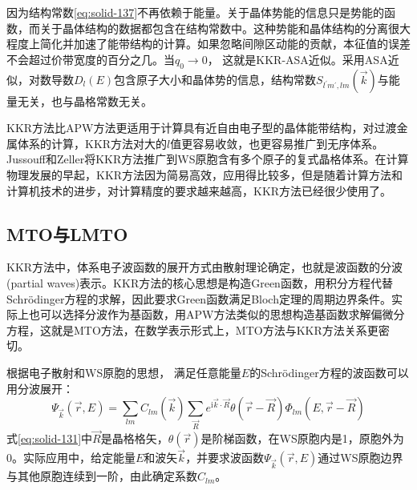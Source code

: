 因为结构常数\eqref{eq:solid-137}不再依赖于能量。关于晶体势能的信息只是势能的函数，而关于晶体结构的数据都包含在结构常数中。这种势能和晶体结构的分离很大程度上简化并加速了能带结构的计算。如果忽略间隙区动能的贡献，本征值的误差不会超过价带宽度的百分之几。当$q_0$$\rightarrow$0，%
这就是KKR-ASA近似。采用ASA近似，对数导数$D_l(E)$包含原子大小和晶体势的信息，结构常数$S_{l^{\prime}m^{\prime},lm}(\vec k)$与能量无关，也与晶格常数无关。

KKR方法比APW方法更适用于计算具有近自由电子型的晶体能带结构，对过渡金属体系的计算，KKR方法对大的$l$值更容易收敛\cite{PPS86-337_1965,PR145-599_1966,Nemoshkalenko-Antonov}，也更容易推广到无序体系。Jussouff和Zeller将KKR方法推广到WS原胞含有多个原子的复式晶格体系\cite{JPF11-1771_1981}。在计算物理发展的早起，KKR方法因为简易高效，应用得比较多，但是随着计算方法和计算机技术的进步，对计算精度的要求越来越高，KKR方法已经很少使用了。


\subsection{MTO与LMTO}
KKR方法中，体系电子波函数的展开方式由散射理论确定，也就是波函数的分波(partial waves)表示。KKR方法的核心思想是构造Green函数，用积分方程代替Schr\"odinger方程的求解，因此要求Green函数满足Bloch定理的周期边界条件。实际上也可以选择分波作为基函数，用APW方法类似的思想构造基函数求解偏微分方程，这就是MTO方法\cite{Andersen,PRB4-1064_1971,SSC11-799_1972,Andersen-unpub-1,Skriver,Xu-Li-II}，在数学表示形式上，MTO方法与KKR方法关系更密切。

根据电子散射和WS原胞的思想\cite{PR43-804_1933}，%
满足任意能量$E$的Schr\"odinger方程的波函数可以用分波展开：
\begin{equation}
	\Psi_{\vec k}(\vec r,E)=\sum_{lm}C_{lm}(\vec k)\sum_{\vec R}e^{\mathrm{i}\vec k\cdot\vec R}\theta(\vec r-\vec R)\Phi_{lm}(E,\vec r-\vec R)
  \label{eq:solid-131}
\end{equation}
式\eqref{eq:solid-131}中$\vec R$是晶格格矢，$\theta(\vec r)$是阶梯函数，在WS原胞内是1，原胞外为0。实际应用中，给定能量$E$和波矢$\vec k$，并要求波函数$\Psi_{\vec k}(\vec r,E)$通过WS原胞边界与其他原胞连续到一阶，由此确定系数$C_{lm}$。

